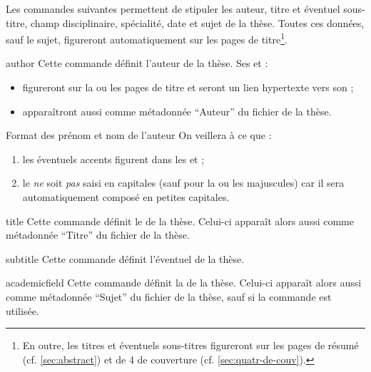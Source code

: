 Les commandes suivantes permettent de stipuler les auteur, titre et éventuel
sous-titre, champ disciplinaire, spécialité, date et sujet de la thèse. Toutes
ces données, sauf le sujet, figureront automatiquement sur les pages de
titre\footnote{En outre, les titres et éventuels sous-titres figureront sur les
  pages de résumé (cf. \vref{sec:abstract}) et de 4\ieme{} de couverture (cf.
  \vref{sec:quatr-de-couv}).}.
%
\begin{docCommand}[doc description=\mandatory]{author}{}
  Cette commande définit l'auteur de la thèse. Ses
   et  :
  \begin{itemize}
  \item figureront sur la ou les pages de titre et seront un lien
    hypertexte vers son ;
  \item apparaîtront aussi comme métadonnée \enquote{Auteur} du
    fichier \pdf de la thèse.
  \end{itemize}
  \begin{dbwarning}{Format des prénom et nom de l'auteur}{}
    On veillera à ce que :
    \begin{enumerate}
    \item les éventuels accents figurent dans les  et
      ;
    \item le  \emph{ne} soit \emph{pas} saisi en capitales
      (sauf pour la ou les majuscules) car il sera automatiquement
      composé en petites capitales.
    \end{enumerate}
  \end{dbwarning}
\end{docCommand}
%
\begin{docCommand}[doc description=\mandatory]{title}{}
  Cette commande définit le  de la thèse. Celui-ci apparaît alors
  aussi comme métadonnée \enquote{Titre} du fichier \pdf de la thèse.
\end{docCommand}
%
\begin{docCommand}{subtitle}{}
  Cette commande définit l'éventuel  de la thèse.
\end{docCommand}
%
\begin{docCommand}[doc description=\mandatory]{academicfield}{}
  Cette commande définit la  
  de la thèse. Celui-ci apparaît alors aussi comme métadonnée \enquote{Sujet} du
  fichier \pdf de la thèse, sauf si la commande  est utilisée.
\end{docCommand}
